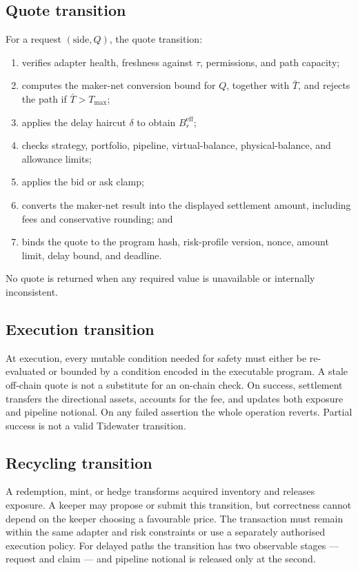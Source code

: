 \documentclass[10pt,twocolumn]{article}
\theoremstyle{definition}
\newcommand{\Bre}{B_{r}^{\mathrm{eff}}}
\begin{document}
\subsection{Quote transition}

For a request $(\text{side},Q)$, the quote transition:

\begin{enumerate}[label=\arabic*.]
  \item verifies adapter health, freshness against $\tau$, permissions, and path capacity;
  \item computes the maker-net conversion bound for $Q$, together with $\bar{T}$, and rejects the path if
        $\bar{T} > T_{\max}$;
  \item applies the delay haircut $\delta$ to obtain $\Bre$;
  \item checks strategy, portfolio, pipeline, virtual-balance, physical-balance, and allowance limits;
  \item applies the bid or ask clamp;
  \item converts the maker-net result into the displayed settlement amount, including fees and conservative
        rounding; and
  \item binds the quote to the program hash, risk-profile version, nonce, amount limit, delay bound, and deadline.
\end{enumerate}

No quote is returned when any required value is unavailable or internally inconsistent.

\subsection{Execution transition}

At execution, every mutable condition needed for safety must either be re-evaluated or bounded by a condition
encoded in the executable program. A stale off-chain quote is not a substitute for an on-chain check. On success,
settlement transfers the directional assets, accounts for the fee, and updates both exposure and pipeline
notional. On any failed assertion the whole operation reverts. Partial success is not a valid Tidewater
transition.

\subsection{Recycling transition}

A redemption, mint, or hedge transforms acquired inventory and releases exposure. A keeper may propose or submit
this transition, but correctness cannot depend on the keeper choosing a favourable price. The transaction must
remain within the same adapter and risk constraints or use a separately authorised execution policy. For delayed
paths the transition has two observable stages --- request and claim --- and pipeline notional is released only at
the second.
\end{document}
